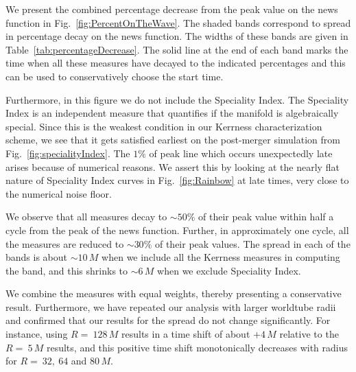 We present the combined percentage decrease from the peak value on the news function in Fig.~\ref{fig:PercentOnTheWave}. The shaded bands correspond to spread in percentage decay on the news function. The widths of these bands are given in Table~\ref{tab:percentageDecrease}. The solid line at the end of each band marks the time when all these measures have decayed to the indicated percentages and this can be used to conservatively choose the start time. 

Furthermore, in this figure we do not include the Speciality Index. The Speciality Index is an independent measure that quantifies if the manifold is algebraically special. Since this is the weakest condition in our Kerrness characterization scheme, we see that it gets satisfied earliest on the post-merger simulation from Fig.~\ref{fig:specialityIndex}. The $1 \%$ of peak line which occurs unexpectedly late arises because of numerical reasons. We assert this by looking at the nearly flat nature of Speciality Index curves in Fig.~\ref{fig:Rainbow} at late times, very close to the numerical noise floor. 

\perOnWave

We observe that all measures decay to $\sim 50 \%$ of their peak value within half a cycle from the peak of the news function. Further, in approximately one cycle, all the measures are reduced to $\sim 30 \%$ of their peak values. The spread in each of the bands is about $\sim 10\,M$ when we include all the Kerrness measures in computing the band, and this shrinks to $\sim 6\,M$ when we exclude Speciality Index. 

We combine the measures with equal weights, thereby presenting a conservative result. Furthermore, we have repeated our analysis with larger worldtube radii and confirmed that our results for the spread do not change significantly. For instance, using $R =~128\,M$ results in a time shift of about $+4\,M$ relative to the $R =~5\,M$ results, and this positive time shift monotonically decreases with radius for $R =~32,~64$ and $80\,M$.






